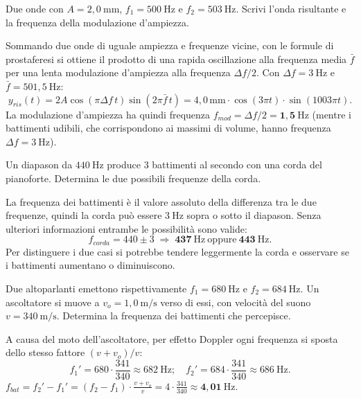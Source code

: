 \begin{question}[ID=4.3, subtitle={Onda risultante da due frequenze quasi uguali}, tags={battimenti, fase}, difficulty=media]
Due onde con $A = 2{,}0\ \mathrm{mm}$, $f_1 = 500\ \mathrm{Hz}$ e $f_2 = 503\ \mathrm{Hz}$. Scrivi l'onda risultante e la frequenza della modulazione d'ampiezza.
\begin{solution}
Sommando due onde di uguale ampiezza e frequenze vicine, con le formule di prostaferesi si ottiene il prodotto di una rapida oscillazione alla frequenza media $\bar{f}$ per una lenta modulazione d'ampiezza alla frequenza $\Delta f/2$. Con $\Delta f = 3\ \mathrm{Hz}$ e $\bar{f} = 501{,}5\ \mathrm{Hz}$:
\[
y_{ris}(t) = 2A\cos(\pi\Delta f\,t)\sin(2\pi\bar{f}\,t) = 4{,}0\,\mathrm{mm}\cdot\cos(3\pi t)\cdot\sin(1003\pi t).
\]
La modulazione d'ampiezza ha quindi frequenza $f_{mod} = \Delta f/2 = \mathbf{1{,}5\ \mathrm{Hz}}$ (mentre i battimenti udibili, che corrispondono ai massimi di volume, hanno frequenza $\Delta f = 3\ \mathrm{Hz}$).
\end{solution}
\end{question}

\begin{question}[ID=4.4, subtitle={Corda del pianoforte leggermente scordato rispetto al diapason}, tags={battimenti, strumenti musicali}, difficulty=media]
Un diapason da $440\ \mathrm{Hz}$ produce $3$ battimenti al secondo con una corda del pianoforte. Determina le due possibili frequenze della corda.
\begin{solution}
La frequenza dei battimenti è il valore assoluto della differenza tra le due frequenze, quindi la corda può essere $3\ \mathrm{Hz}$ sopra o sotto il diapason. Senza ulteriori informazioni entrambe le possibilità sono valide:
\[
f_{corda} = 440 \pm 3 \;\Rightarrow\; \mathbf{437\ \mathrm{Hz}} \ \text{oppure}\ \mathbf{443\ \mathrm{Hz}}.
\]
Per distinguere i due casi si potrebbe tendere leggermente la corda e osservare se i battimenti aumentano o diminuiscono.
\end{solution}
\end{question}

\begin{question}[ID=4.5, subtitle={Battimenti con effetto Doppler per osservatore in moto}, tags={battimenti, superposizione}, difficulty=difficile]
Due altoparlanti emettono rispettivamente $f_1 = 680\ \mathrm{Hz}$ e $f_2 = 684\ \mathrm{Hz}$. Un ascoltatore si muove a $v_o = 1{,}0\ \mathrm{m/s}$ verso di essi, con velocità del suono $v = 340\ \mathrm{m/s}$. Determina la frequenza dei battimenti che percepisce.
\begin{solution}
A causa del moto dell'ascoltatore, per effetto Doppler ogni frequenza si sposta dello stesso fattore $(v+v_o)/v$:
\[
f_1' = 680\cdot\frac{341}{340} \approx 682\ \mathrm{Hz};\quad f_2' = 684\cdot\frac{341}{340} \approx 686\ \mathrm{Hz}.
\]
$f_{bat} = f_2' - f_1' = (f_2-f_1)\cdot\frac{v+v_o}{v} = 4\cdot\frac{341}{340} \approx \mathbf{4{,}01\ \mathrm{Hz}}$.
\end{solution}
\end{question}

